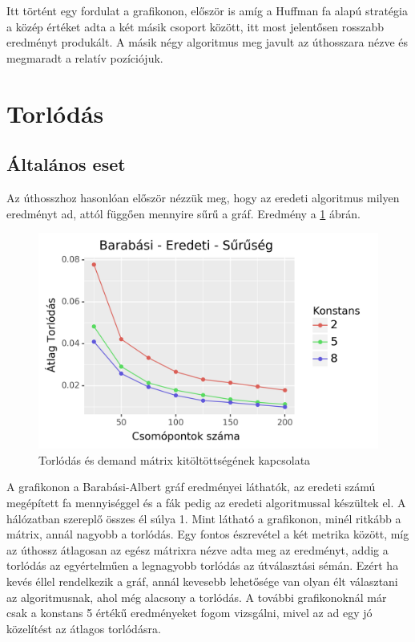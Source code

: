 \documentclass[12pt]{report}
\begin{document}
Itt történt egy fordulat a grafikonon, először is amíg a Huffman fa alapú stratégia a közép értéket adta a két másik csoport között, itt most jelentősen rosszabb eredményt produkált.
A másik négy algoritmus meg javult az úthosszara nézve és megmaradt a relatív pozíciójuk.

\section{Torlódás}

\subsection{Általános eset}

Az úthosszhoz hasonlóan először nézzük meg, hogy az eredeti algoritmus milyen eredményt ad, attól függően mennyire sűrű a gráf.
Eredmény a \ref{density-con} ábrán.

\begin{figure}[H]
	\begin{center}
		\includegraphics[width=0.9\linewidth]{pictures/density_con.png}
		\caption{Torlódás és demand mátrix kitöltöttségének kapcsolata }
		\label{density-con}
	\end{center}
\end{figure}

A grafikonon a Barabási-Albert gráf eredményei láthatók, az eredeti számú megépített fa mennyiséggel és a fák pedig az eredeti algoritmussal készültek el.
A hálózatban szereplő összes él súlya 1.
Mint látható a grafikonon, minél ritkább a mátrix, annál nagyobb a torlódás. 
Egy fontos észrevétel a két metrika között, míg az úthossz átlagosan az egész mátrixra nézve adta meg az eredményt, addig a torlódás az egyértelműen a legnagyobb torlódás az útválasztási sémán.
Ezért ha kevés éllel rendelkezik a gráf, annál kevesebb lehetősége van olyan élt választani az algoritmusnak, ahol még alacsony a torlódás.
A további grafikonoknál már csak a konstans 5 értékű eredményeket fogom vizsgálni, mivel az ad egy jó közelítést az átlagos torlódásra.
\end{document}
